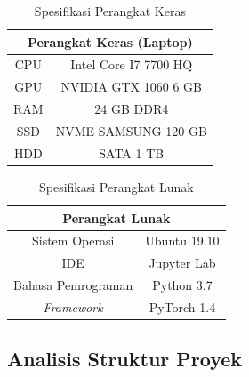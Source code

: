 \begin{table}[htbp]
    \captionsetup{labelfont=bf, textfont=bf}
    \caption{Spesifikasi Perangkat Keras}
    \label{tab:spesifikasiperangkatkeras}
    \vspace{-20pt}
    \begin{center}
        \begin{tabular}{|c|c|}
            \hline
            \multicolumn{2}{|c|}{\textbf{Perangkat Keras (Laptop)}} \\ \hline
            CPU & Intel Core I7 7700 HQ                             \\ \hline
            GPU & NVIDIA GTX 1060 6 GB                              \\ \hline
            RAM & 24 GB DDR4                                        \\ \hline
            SSD & NVME SAMSUNG 120 GB                               \\ \hline
            HDD & SATA 1 TB                                         \\ \hline
        \end{tabular}
    \end{center}
\end{table}

\begin{table}[htbp]
    \captionsetup{labelfont=bf, textfont=bf}
    \caption{Spesifikasi Perangkat Lunak}
    \label{tab:spesifikasiperangkatlunak}
    \vspace{-20pt}
    \begin{center}
        \begin{tabular}{|c|c|}
            \hline
            \multicolumn{2}{|c|}{\textbf{Perangkat Lunak}} \\ \hline
            Sistem Operasi      & Ubuntu 19.10             \\ \hline
            IDE                 & Jupyter Lab              \\ \hline
            Bahasa Pemrograman  & Python 3.7               \\ \hline
            \textit{Framework } & PyTorch 1.4              \\ \hline
        \end{tabular}
    \end{center}
\end{table}

\subsection{Analisis Struktur Proyek}

